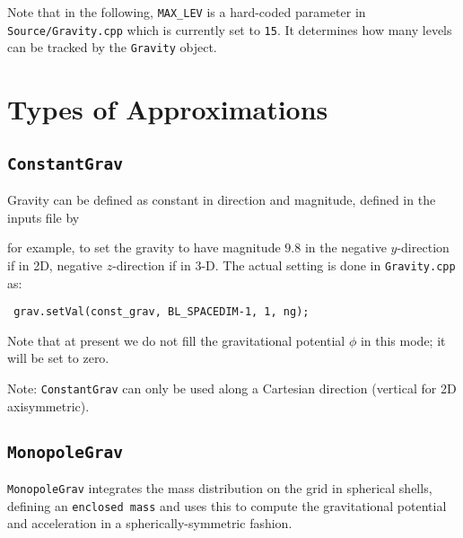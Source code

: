 Note that in the following, {\tt MAX\_LEV} is a hard-coded parameter
in {\tt Source/Gravity.cpp} which is currently set to {\tt 15}.  It
determines how many levels can be tracked by the {\tt Gravity} object.


\section{Types of Approximations}

\subsection{{\tt ConstantGrav}}

Gravity can be defined as constant in direction and magnitude,
defined in the inputs file by


for example, to set the gravity to have magnitude $9.8$ in the
negative $y$-direction if in 2D, negative $z$-direction if in 3-D.
The actual setting is done in {\tt Gravity.cpp} as:
\begin{lstlisting}
 grav.setVal(const_grav, BL_SPACEDIM-1, 1, ng);
\end{lstlisting}

Note that at present we do not fill the gravitational potential $\phi$ in
this mode; it will be set to zero.

Note: {\tt ConstantGrav} can only be used along a Cartesian direction
(vertical for 2D axisymmetric).


\subsection{{\tt MonopoleGrav}}
\label{sec-monopole-grav}

{\tt MonopoleGrav} integrates the mass distribution on the grid
in spherical shells, defining an {\tt enclosed mass} and uses this
to compute the gravitational potential and acceleration in a 
spherically-symmetric fashion.

